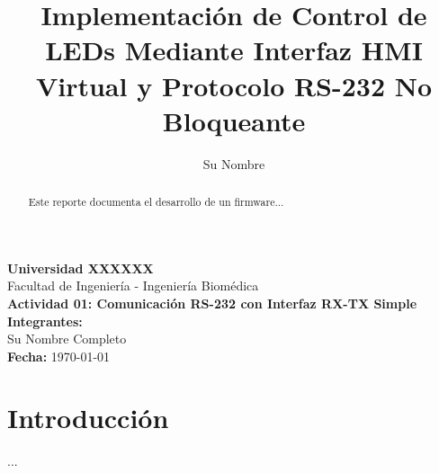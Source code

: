 \documentclass[10pt, conference, compsocconf, letterpaper]{IEEEtran}
\begin{document}
\begin{titlepage}
    \centering
    \vspace*{1cm}
    {\huge \textbf{Universidad XXXXXX}} \\
    \vspace{0.5cm}
    {\Large Facultad de Ingeniería - Ingeniería Biomédica} \\
    \vfill
    {\Large \textbf{Actividad 01: Comunicación RS-232 con Interfaz RX-TX Simple}} \\
    \vspace{1.5cm}
    \textbf{Integrantes:} \\
    Su Nombre Completo \\
    \vfill
    \textbf{Fecha:} \today
\end{titlepage}

\newpage
{} %

\title{Implementación de Control de LEDs Mediante Interfaz HMI Virtual y Protocolo RS-232 No Bloqueante}
\author{Su Nombre}
\maketitle

\begin{abstract}
Este reporte documenta el desarrollo de un firmware...
\end{abstract}

\section{Introducción}
...
\end{document}
